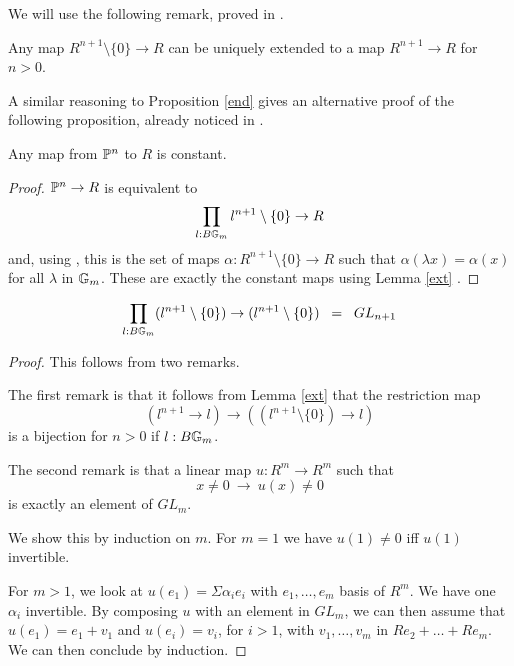 We will use the following remark, proved in \cite{draft}.

\begin{lemma}\label{ext}
  Any map $R^{n+1}\setminus\{0\}\rightarrow R$ can be uniquely extended to a map $R^{n+1}\rightarrow R$ for $n>0$.
\end{lemma}

A similar reasoning to Proposition \ref{end} gives an alternative proof of the following proposition, already noticed in \cite{draft}.

\begin{proposition}\label{const}
 Any map from $\mathbb{P}^n$ to $R$ is constant.
\end{proposition}

\begin{proof}
  $\mathbb{P}^n\rightarrow R$ is equivalent to
  $$\prod_{l:B\mathbb{G}_m}l^{n+1}\setminus\{0\}\rightarrow R$$
  and, using \cite{Sym}, this is the set of maps $\alpha:R^{n+1}\setminus\{0\}\rightarrow R$
  such that $\alpha(\lambda x) = \alpha(x)$ for all $\lambda$ in $\mathbb{G}_m$. These are exactly the constant maps
  using Lemma \ref{ext} \cite{draft}.
\end{proof}

\begin{proposition}\label{aut}
$$\prod_{l:B\mathbb{G}_m}(l^{n+1}\setminus\{0\})\rightarrow (l^{n+1}\setminus\{0\}) \;\;=\;\; GL_{n+1}$$
\end{proposition}

\begin{proof}
  This follows from two remarks.

  The first remark is that it follows from Lemma \ref{ext} that the restriction map
$$
(l^{n+1}\rightarrow l)\rightarrow ((l^{n+1}\setminus\{0\})\rightarrow l)
$$
is a bijection for $n>0$ if $l:B\mathbb{G}_m$.

\medskip

The second remark is that a linear map $u:R^{m}\rightarrow R^{m}$ such that
$$
x\neq 0~\rightarrow~u(x)\neq 0
$$
is exactly an element of $GL_{m}$.

We show this by induction on $m$. For $m=1$ we have $u(1)\neq 0$ iff $u(1)$ invertible.

For $m>1$, we look at $u(e_1) = \Sigma \alpha_ie_i$ with $e_1,\dots,e_m$ basis of $R^m$.
We have one $\alpha_i$ invertible. By composing $u$ with an element in $GL_m$, we can then
assume that $u(e_1) = e_1+v_1$ and $u(e_i) = v_i$, for $i>1$, with $v_1,\dots,v_m$ in $Re_2+\dots+Re_m$.
We can then conclude by induction.
\end{proof}

